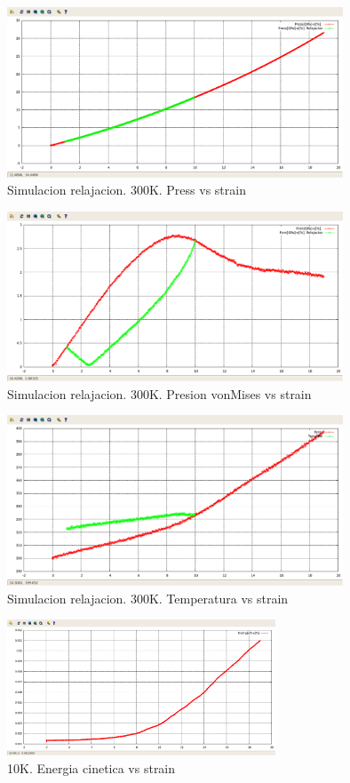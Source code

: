 \documentclass[10pt, oneside]{article} %
\begin{document}
\begin{figure}[H]
\centering
\includegraphics[width=10cm]{Figures/300_Relax_Press_COMP.png}
\caption{Simulacion relajacion. 300K. Press vs strain}
\end{figure}

\begin{figure}[H]
\centering
\includegraphics[width=10cm]{Figures/300_Relax_PVM-e_COMP.png}
\caption{Simulacion relajacion. 300K. Presion vonMises vs strain}
\end{figure}

\begin{figure}[H]
\centering
\includegraphics[width=10cm]{Figures/300_Relax_Temp_COMP.png}
\caption{Simulacion relajacion. 300K. Temperatura vs strain}
\end{figure}

\begin{figure}[H]
\centering
\includegraphics[width=8cm]{Figures/10-KinEng-deformacion.png}
\caption{10K. Energia cinetica vs strain}
\end{figure}
\end{document}
